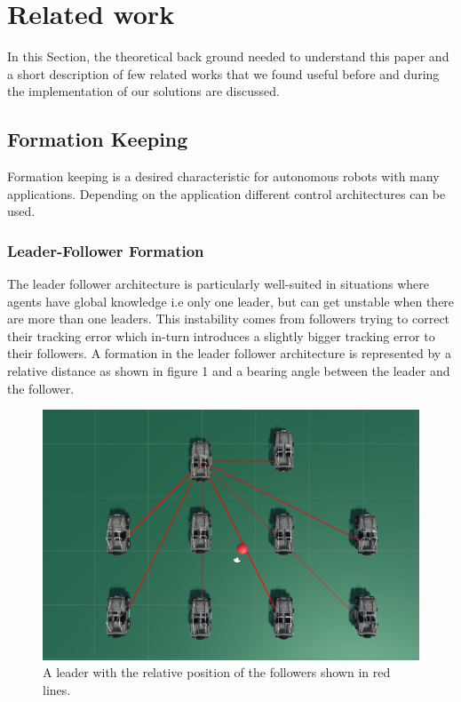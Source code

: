 \documentclass[a4paper,12pt]{article}
\begin{document}

\section{Related work}
\label{sec:relwork}
In this Section, the theoretical back ground needed to understand this paper and a short description of few related works that we found useful before and during the implementation of our solutions are discussed.
\subsection{Formation Keeping}
\label{sec:fk}
Formation keeping is a desired characteristic for autonomous robots with many applications. Depending on the application different control architectures can be used.          

\subsubsection{Leader-Follower Formation}
\label{sec:lf}
The leader follower architecture is particularly well-suited in situations where agents have global knowledge i.e only one leader, but can get unstable when there are more than one leaders. This instability comes from followers trying to correct their tracking error which in-turn introduces a slightly bigger tracking error to their followers.
A formation in the leader follower architecture is represented by a relative distance as shown in figure 1 and a bearing angle between the leader and the follower\cite{bazoula2008formation}. 

\begin{figure}
\centering
\includegraphics[width=0.8\linewidth]{Leader-Follower}
\caption{A leader with the relative position of the followers shown in red lines.}
\label{fig:Leader-Follower}
\end{figure}  
\end{document}
